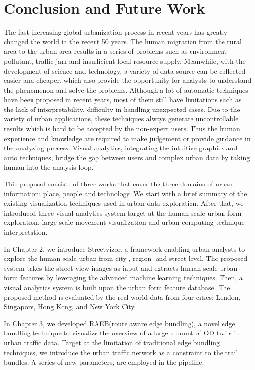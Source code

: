\chapter{Conclusion and Future Work}

The fast increasing global urbanization process in recent years has greatly changed the world in the recent 50 years. The human migration from the rural area to the urban area results in a series of problems such as environment pollutant, traffic jam and insufficient local resource supply. Meanwhile, with the development of science and technology, a variety of data source can be collected easier and cheaper, which also provide the opportunity for analysts to understand the phenomenon and solve the problems. Although a lot of automatic techniques have been proposed in recent years, most of them still have limitations such as the lack of interpretability, difficulty in handling unexpected cases. Due to the variety of urban applications, these techniques always generate uncontrollable results which is hard to be accepted by the non-expert users. Thus the human experience and knowledge are required to make judgement or provide guidance in the analyzing process. Visual analytics, integrating the intuitive graphics and auto techniques, bridge the gap between users and complex urban data by taking human into the analysis loop.  

This proposal consists of three works that cover the three domains of urban information: place, people and technology. We start with a brief summary of the existing visualization techniques used in urban data exploration. After that, we introduced three visual analytics system target at the human-scale urban form exploration, large scale movement visualization and urban computing technique interpretation. 

In Chapter 2, we introduce Streetvizor, a framework enabling urban analysts to explore the human scale urban from city-, region- and street-level. The proposed system takes the street view images as input and extracts human-scale urban form features by leveraging the advanced machine learning techniques. Then, a visual analytics system is built upon the urban form feature database. The proposed method is evaluated by the real world data from four cities: London, Singapore, Hong Kong, and New York City. 

In Chapter 3, we developed RAEB(route aware edge bundling), a novel edge bundling technique to visualize the overview of a large amount of OD trails in urban traffic data. Target at the limitation of traditional edge bundling techniques, we introduce the urban traffic network as a constraint to the trail bundles. A series of new parameters, are employed in the pipeline.


